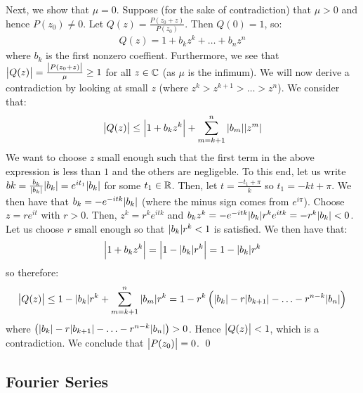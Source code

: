 \begin{nproof}
    Next, we show that $\mu = 0$. Suppose (for the sake of contradiction) that $\mu > 0$ and hence $P(z_0) \neq 0$. Let $Q(z) = \frac{P(z_0 + z)}{P(z_0)}$. Then $Q(0) = 1$, so:
    \begin{align*}
        Q(z) = 1 + b_kz^k + \ldots + b_nz^n
    \end{align*}
    where $b_k$ is the first nonzero coeffient. Furthermore, we see that $\abs{Q(z)} = \frac{\abs{P(z_0 + z)}}{\mu} \geq 1$ for all $z \in \mathbb{C}$ (as $\mu$ is the infimum). We will now derive a contradiction by looking at small $z$ (where $z^k > z^{k+1} > \ldots > z^n$). We consider that:
    \begin{align*}
        \abs{Q(z)} \leq \abs{1 + b_kz^k} + \sum_{m=k+1}^n \abs{b_m}\abs{z^m}
    \end{align*}
    We want to choose $z$ small enough such that the first term in the above expression is less than $1$ and the others are negligeble. To this end, let us write $bk = \frac{b_k}{\abs{b_k}}\abs{b_k} = e^{it_1}\abs{b_k}$ for some $t_1 \in \mathbb{R}$. Then, let $t = \frac{-t_1 + \pi}{k}$ so $t_1 = -kt + \pi$. We then have that $b_k = -e^{-itk}\abs{b_k}$ (where the minus sign comes from $e^{i\pi}$). Choose $z = re^{it}$ with $r > 0$. Then, $z^k = r^ke^{itk}$ and $b_kz^k = -e^{-itk}\abs{b_k}r^ke^{itk} = -r^k\abs{b_k} < 0$. Let us choose $r$ small enough so that $\abs{b_k}r^k < 1$ is satisfied. We then have that:
    \begin{align*}
        \abs{1 + b_kz^k} = \abs{1 - \abs{b_k}r^k} = 1 - \abs{b_k}r^k
    \end{align*}
    so therefore:
    \begin{align*}
        \abs{Q(z)} \leq 1 - \abs{b_k}r^k + \sum_{m=k+1}^n \abs{b_m}r^k = 1 - r^k\left(\abs{b_k} - r\abs{b_{k+1}} - \ldots - r^{n-k}\abs{b_n}\right)
    \end{align*}
    where $\left(\abs{b_k} - r\abs{b_{k+1}} - \ldots - r^{n-k}\abs{b_n}\right) > 0$. Hence $\abs{Q(z)} < 1$, which is a contradiction. We conclude that $\abs{P(z_0)} = 0$. \qed
\end{nproof}

\subsection{Fourier Series}